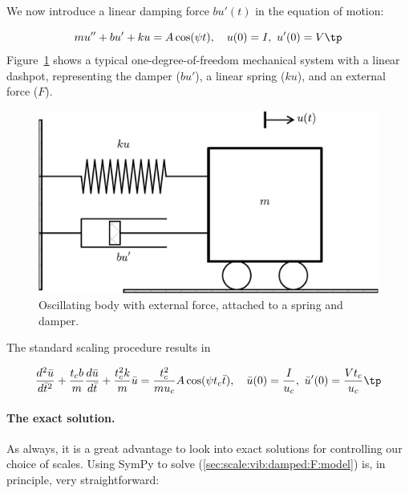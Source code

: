 \documentclass[graybox,envcountchap,sectrefs,final]{svmonodo}
\begin{document}
We now introduce a linear damping force $bu'(t)$ in the equation of motion:

\begin{equation}
mu'' + bu' + ku = A\cos(\psi t),\quad u(0)=I,\ u'(0)=V\tp
\label{sec:scale:vib:damped:F:model}
\end{equation}
Figure~\ref{sec:scale:vib:damped:sketch} shows a typical
one-degree-of-freedom mechanical system with a linear dashpot, representing
the damper ($bu'$), a linear spring ($ku$), and an external force ($F$).


\begin{figure}[!ht]  %
  \centerline{\includegraphics[width=0.6\linewidth]{fig-scaling/oscillator.pdf}}
  \caption{
  Oscillating body with external force, attached to a spring and damper. \label{sec:scale:vib:damped:sketch}
  }
\end{figure}


The standard scaling procedure results in

\begin{equation}
\frac{d^2\bar u}{d\bar t^2} + \frac{t_c b}{m}\frac{d\bar u}{d\bar t}
+ \frac{t_c^2 k}{m}\bar u =
\frac{t_c^2}{mu_c}A\cos(\psi t_c\bar t),
\quad \bar u(0)=\frac{I}{u_c},\ \bar u'(0)=\frac{Vt_c}{u_c}\tp
\label{sec:scale:vib:damped:F:model:scaled0}
\end{equation}

\paragraph{The exact solution.}
As always, it is
a great advantage to look into exact solutions for controlling our
choice of scales.
Using SymPy to solve (\ref{sec:scale:vib:damped:F:model}) is, in principle,
very straightforward:
\end{document}
